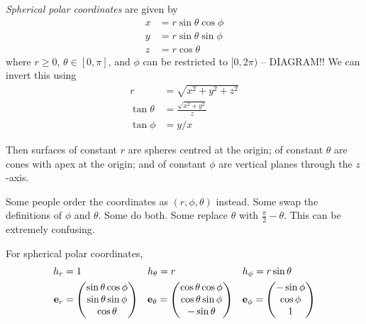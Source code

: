 \documentclass{../../template/note}
\begin{document}
    \begin{definition*}
        \emph{Spherical polar coordinates} are given by
        \begin{align*}
            x &= r \sin \theta \cos \phi \\
            y &= r \sin \theta \sin \phi \\
            z &= r \cos \theta
        \end{align*}
        where \(r \geq 0\), \(\theta \in [0, \pi]\), and \(\phi\) can be restricted to \([0, 2\pi)\) -- DIAGRAM!! We can invert this using
        \begin{align*}
            r &= \sqrt{x^2+y^2+z^2} \\
            \tan \theta &= \frac{\sqrt{x^2+y^2}}{z} \\
            \tan \phi &= y/x
        \end{align*}
    \end{definition*}
    
    Then surfaces of constant \(r\) are spheres centred at the origin; of constant \(\theta\) are cones with apex at the origin; and of constant \(\phi\) are vertical planes through the \(z\)-axis.

    \begin{remark*}
        Some people order the coordinates as \((r, \phi, \theta)\) instead. Some swap the definitions of \(\phi\) and \(\theta\). Some do both. Some replace \(\theta\) with \(\frac{\pi}{2} - \theta\). This can be extremely confusing.
    \end{remark*}
    
    \begin{proposition}
        \label{3.4} For spherical polar coordinates, \begin{align*}
            h_r &= 1 && h_\theta = r && h_\phi = r \sin \theta \\
            \V e_r &= \begin{pmatrix}
             \sin \theta \cos \phi \\
             \sin \theta \sin \phi \\
             \cos \theta \\
            \end{pmatrix} && \V e_\theta = \begin{pmatrix}
             \cos \theta \cos \phi \\
             \cos \theta \sin \phi \\
             -\sin \theta \\
            \end{pmatrix} && \V e_\phi = \begin{pmatrix}
             -\sin \phi \\
             \cos \phi \\
             1 \\
            \end{pmatrix}
        \end{align*}
    \end{proposition}
\end{document}
